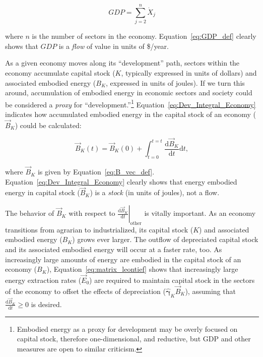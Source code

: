 \begin{equation} \label{eq:GDP_def}
	GDP
	= \sum\limits_{j=2}^{n} \dot{X}_{j}
\end{equation}

\noindent{}where $n$ is the number of sectors in the economy.
Equation~\ref{eq:GDP_def} clearly shows that 
$GDP$ is a \emph{flow} of value in units of \$/year.

As a given economy moves along its ``development'' path,
sectors within the economy accumulate capital stock 
($K$, typically expressed in units of dollars)
and associated embodied energy 
($B_{K}$, expressed in units of joules).
If we turn this around, 
accumulation of embodied energy in economic sectors and society 
could be considered a \emph{proxy} for ``development.''\footnote{Embodied energy 
as a proxy for development may be overly focused on capital stock, 
therefore one-dimensional, and reductive, 
but GDP and other measures are open to similar criticism.}
Equation~\ref{eq:Dev_Integral_Economy} indicates how accumulated
embodied energy in the capital stock 
of an economy ($\vec{B}_{K}$) could be calculated:

\begin{equation} \label{eq:Dev_Integral_Economy}
	\vec{B}_{K}(t) 
	= \vec{B}_{K}(0) 
	+ \int_{t=0}^{t=t} \frac{\mathrm{d}\vec{B}_{K}}{\mathrm{d}t}\mathrm{d}t,
\end{equation}

\noindent{}where $\vec{B}_{K}$ is given by Equation~\ref{eq:B_vec_def}.
Equation~\ref{eq:Dev_Integral_Economy} clearly shows
that energy embodied energy in capital stock ($\vec{B}_{K}$) 
is a \emph{stock} (in units of joules), not a flow.

The behavior of $\vec{B}_{K}$ with respect to
$\left. \frac{\mathrm{d}\vec{B}_{K}}{\mathrm{d}t} \right|_{\mathrm{other}}$ 
is vitally important. 
As an economy transitions from agrarian to industrialized, 
its capital stock ($K$) and associated embodied energy ($B_{K}$)
grows ever larger. 
The outflow of depreciated capital stock and its associated embodied energy 
will occur at a faster rate, too.
As increasingly large amounts of energy are embodied 
in the capital stock of an economy ($B_{K}$), 
Equation~\ref{eq:matrix_leontief} shows that
increasingly large energy extraction rates ($\vec{E}_{0}$) 
are required to maintain capital stock 
in the sectors of the economy
to offset the effects of depreciation 
($\hat{\boldsymbol{\gamma}}_{K} \vec{B}_{K}$),
assuming that $\frac{\mathrm{d}\vec{B}_{K}}{\mathrm{d}t} \ge 0$ 
is desired. 

